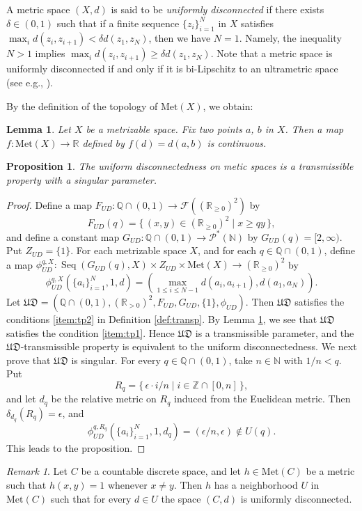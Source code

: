 \documentclass[a4paper, 12pt]{amsart}
\theoremstyle{plain}
\newtheorem{prop}[thm]{Proposition}
\newtheorem{lem}[thm]{Lemma}
\theoremstyle{definition}
\theoremstyle{remark}
\newtheorem{rmk}{Remark}[section]
\newcommand{\nn}{\mathbb{N}}
\newcommand{\zz}{\mathbb{Z}}
\newcommand{\qq}{\mathbb{Q}}
\newcommand{\rr}{\mathbb{R}}
\DeclareMathOperator{\seq}{Seq}
\newcommand{\met}[1]{\mathrm{Met}(#1)}
\begin{document}
A metric space 
$(X, d)$ 
is said to be 
\emph{uniformly disconnected} 
if there exists  
$\delta\in (0, 1)$
such that if a finite sequence 
$\{z_{i}\}_{i=1}^{N}$ 
in 
$X$ 
satisfies 
$\max_{i}d(z_{i}, z_{i+1})< \delta d(z_{1}, z_{N})$, 
then we have 
$N=1$. 
Namely, the inequality  $N>1$
implies  $\max_{i}d(z_{i}, z_{i+1})\ge \delta d(z_{1}, z_{N})$. 
Note that a metric space is uniformly disconnected 
if and only if 
it is bi-Lipschitz to an ultrametric space 
(see e.g.,  \cite[Lemma 5.1.10]{MR2662522}). 




By the definition of the topology of 
$\met{X}$, 
we obtain:
\begin{lem}\label{lem:dcon}
Let 
$X$ 
be a metrizable space. 
Fix two points 
$a$, $b$ 
in 
$X$. 
Then a map 
$f\colon \met{X}\to \rr$ 
defined by 
$f(d)=d(a, b)$ 
is 
continuous.  
\end{lem}
\begin{prop}\label{prop:ud:241018}
The uniform disconnectedness on metic spaces 
is a transmissible  property with a singular parameter. 
\end{prop}
\begin{proof}
Define a map 
$F_{UD}\colon  \qq\cap (0, 1)\to \mathcal{F}((\rr_{\ge 0})^{2})$
by 
	\[
	F_{UD}(q)=\{\, (x, y)\in (\rr_{\ge 0})^{2}\mid x\ge qy\, \}, 
	\]
and define a constant map 
$G_{UD}\colon  \qq\cap (0, 1)\to \mathcal{P}^{*}(\nn)$
 by 
 $G_{UD}(q)=[2, \infty)$. 
Put 
$Z_{UD}=\{1\}$. 
 For each metrizable space 
 $X$,  
 and for each 
 $q\in \qq\cap (0, 1)$, 
define a map
$\phi_{UD}^{q, X}\colon  \seq(G_{UD}(q), X)\times Z_{UD}\times \met{X}\to (\rr_{\ge 0})^{2}$
by 
\[
	\phi_{UD}^{q, X}(\{a_{i}\}_{i=1}^{N}, 1, d)
	=
	\left(\max_{1\le i\le N-1}d(a_{i}, a_{i+1}), d(a_{1}, a_{N})\right). 
\]
Let 
$\mathfrak{UD}=(\qq\cap (0, 1), (\rr_{>0})^{2}, F_{UD}, G_{UD},  \{1\}, \phi_{UD})$.  
Then 
$\mathfrak{UD}$ 
satisfies the conditions 
\ref{item:tp2} in Definition \ref{def:transp}. 
By Lemma
 \ref{lem:dcon}, 
we see that
 $\mathfrak{UD}$ 
 satisfies the condition 
 \ref{item:tp1}. 
Hence 
$\mathfrak{UD}$  
is a transmissible parameter,  
and the 
 $\mathfrak{UD}$-transmissible property 
 is equivalent to 
the uniform disconnectedness. 
We next prove that 
$\mathfrak{UD}$
 is singular. 
For every 
$q\in \qq\cap (0,  1)$, 
take 
$n\in \nn$ 
with 
$1/n< q$. 
Put 
\[
	R_q=\{\, \epsilon\cdot i/n\mid i\in \zz\cap [0, n]\, \}, 
\] 
and let 
$d_{q}$
 be the relative metric on 
$R_{q}$ 
induced from the Euclidean metric. 
Then 
$\delta_{d_{q}}(R_{q})=\epsilon$,  
and 
\[
	\phi_{UD}^{q, R_q}(\{a_{i}\}_{i=1}^N, 1, d_q)=
	(\epsilon/n, \epsilon)\not\in U(q).
\] 
This leads to the proposition. 
\end{proof}
\begin{rmk}
Let 
$C$ 
be a countable discrete space, 
and let
 $h\in \met{C}$ 
 be a metric 
 such that 
 $h(x, y)=1$ whenever 
 $x\neq y$. 
Then 
$h$ 
has a neighborhood 
$U$ 
in 
$\met{C}$ 
such that for every 
$d\in U$ 
the space 
$(C, d)$ 
is uniformly disconnected. 
\end{rmk}
\end{document}
